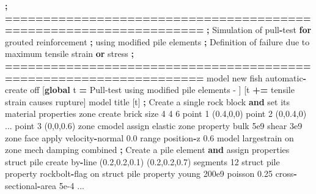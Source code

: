 \documentclass[a4paper, nobind]{templates/ociamthesis}
\newenvironment{Shaded}{\begin{snugshade}}{\end{snugshade}}
\newcommand{\BuiltInTok}[1]{#1}
\newcommand{\ControlFlowTok}[1]{\textcolor[rgb]{0.13,0.29,0.53}{\textbf{#1}}}
\newcommand{\DecValTok}[1]{\textcolor[rgb]{0.00,0.00,0.81}{#1}}
\newcommand{\FloatTok}[1]{\textcolor[rgb]{0.00,0.00,0.81}{#1}}
\newcommand{\KeywordTok}[1]{\textcolor[rgb]{0.13,0.29,0.53}{\textbf{#1}}}
\newcommand{\NormalTok}[1]{#1}
\newcommand{\OperatorTok}[1]{\textcolor[rgb]{0.81,0.36,0.00}{\textbf{#1}}}
\newcommand{\StringTok}[1]{\textcolor[rgb]{0.31,0.60,0.02}{#1}}
\renewenvironment{Shaded}
{
  \vspace{10pt}%
  \begin{snugshade}%
}{%
  \end{snugshade}%
  \vspace{8pt}%
}
\begin{document}
\begin{Shaded}
\begin{Highlighting}[]
    \OperatorTok{;} \OperatorTok{==================================================================}
    \OperatorTok{;}\NormalTok{   Simulation of pull}\OperatorTok{{-}}\NormalTok{test }\ControlFlowTok{for}\NormalTok{ grouted reinforcement}
    \OperatorTok{;}\NormalTok{   using modified pile elements}
    \OperatorTok{;}\NormalTok{     Definition of failure due to maximum tensile strain }\KeywordTok{or}\NormalTok{ stress}
    \OperatorTok{;} \OperatorTok{==================================================================}
\NormalTok{    model new}
\NormalTok{    fish automatic}\OperatorTok{{-}}\NormalTok{create off}
\NormalTok{    [}\KeywordTok{global}\NormalTok{ t }\OperatorTok{=}  \StringTok{\textquotesingle{}Pull{-}test using modified pile elements {-} \textquotesingle{}}\NormalTok{]}
\NormalTok{    [t }\OperatorTok{+=} \StringTok{\textquotesingle{}tensile strain causes rupture\textquotesingle{}}\NormalTok{]}
\NormalTok{    model title [t]}
    \OperatorTok{;}\NormalTok{ Create a single rock block }\KeywordTok{and} \BuiltInTok{set}\NormalTok{ its material properties}
\NormalTok{    zone create brick size }\DecValTok{4} \DecValTok{4} \DecValTok{6}\NormalTok{ point }\DecValTok{1}\NormalTok{ (}\FloatTok{0.4}\NormalTok{,}\DecValTok{0}\NormalTok{,}\DecValTok{0}\NormalTok{) point }\DecValTok{2}\NormalTok{ (}\DecValTok{0}\NormalTok{,}\FloatTok{0.4}\NormalTok{,}\DecValTok{0}\NormalTok{) ...}
\NormalTok{                                 point }\DecValTok{3}\NormalTok{ (}\DecValTok{0}\NormalTok{,}\DecValTok{0}\NormalTok{,}\FloatTok{0.6}\NormalTok{)}
\NormalTok{    zone cmodel assign elastic}
\NormalTok{    zone }\BuiltInTok{property}\NormalTok{ bulk }\FloatTok{5e9}\NormalTok{ shear }\FloatTok{3e9}
\NormalTok{    zone face }\BuiltInTok{apply}\NormalTok{ velocity}\OperatorTok{{-}}\NormalTok{normal }\FloatTok{0.0} \BuiltInTok{range}\NormalTok{ position}\OperatorTok{{-}}\NormalTok{z }\FloatTok{0.6}
\NormalTok{    model largestrain on}
\NormalTok{    zone mech damping combined}
    \OperatorTok{;}\NormalTok{ Create a pile element }\KeywordTok{and}\NormalTok{ assign properties}
\NormalTok{    struct pile create by}\OperatorTok{{-}}\NormalTok{line (}\FloatTok{0.2}\NormalTok{,}\FloatTok{0.2}\NormalTok{,}\FloatTok{0.1}\NormalTok{) (}\FloatTok{0.2}\NormalTok{,}\FloatTok{0.2}\NormalTok{,}\FloatTok{0.7}\NormalTok{) segments }\DecValTok{12}
\NormalTok{    struct pile }\BuiltInTok{property}\NormalTok{ rockbolt}\OperatorTok{{-}}\NormalTok{flag on}
\NormalTok{    struct pile }\BuiltInTok{property}\NormalTok{ young }\FloatTok{200e9}\NormalTok{ poisson }\FloatTok{0.25}\NormalTok{ cross}\OperatorTok{{-}}\NormalTok{sectional}\OperatorTok{{-}}\NormalTok{area }\FloatTok{5e{-}4}\NormalTok{ ...}

\end{Highlighting}
\end{Shaded}
\end{document}
